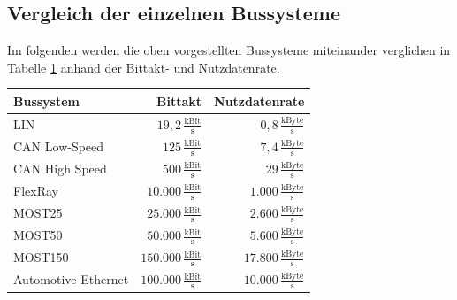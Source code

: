 \subsection{Vergleich der einzelnen Bussysteme}
Im folgenden werden die oben vorgestellten Bussysteme miteinander verglichen in Tabelle \ref{tab:Bussysteme} anhand der Bittakt- und Nutzdatenrate.
\begin{table}[hbt]	
	\centering
	\renewcommand{\arraystretch}{1.5}	%
	\label{tab:Bussysteme}
	\begin{tabular}{l|rr}
		 \parbox[t]{0.2\linewidth}{\centering Bussystem} & \parbox[t]{0.2\linewidth}{\centering Bittakt} & \parbox[t]{0.2\linewidth}{\centering Nutzdatenrate}  \\ 
		\hline 
		\hline
		LIN & $ 19,2\,\frac{\mathrm{kBit}}{\mathrm{s}} $ & $ 0,8\,\frac{\mathrm{kByte}}{\mathrm{s}} $  \\
		CAN Low-Speed & $ 125\,\frac{\mathrm{kBit}}{\mathrm{s}} $ & $ 7,4\,\frac{\mathrm{kByte}}{\mathrm{s}} $ \\
		CAN High Speed & $ 500\,\frac{\mathrm{kBit}}{\mathrm{s}} $ & $ 29\,\frac{\mathrm{kByte}}{\mathrm{s}} $  \\
		FlexRay & $ 10.000\,\frac{\mathrm{kBit}}{\mathrm{s}} $ & $ 1.000 \,\frac{\mathrm{kByte}}{\mathrm{s}} $  \\
		MOST25 & $ 25.000\,\frac{\mathrm{kBit}}{\mathrm{s}} $ & $ 2.600\,\frac{\mathrm{kByte}}{\mathrm{s}} $  \\
		MOST50 & $ 50.000\,\frac{\mathrm{kBit}}{\mathrm{s}} $ & $ 5.600\,\frac{\mathrm{kByte}}{\mathrm{s}} $  \\
		MOST150 & $ 150.000\,\frac{\mathrm{kBit}}{\mathrm{s}} $ & $ 17.800\,\frac{\mathrm{kByte}}{\mathrm{s}} $  \\
		Automotive Ethernet & $ 100.000\,\frac{\mathrm{kBit}}{\mathrm{s}} $ & $ 10.000\,\frac{\mathrm{kByte}}{\mathrm{s}} $  \\
	\end{tabular} 
\end{table}
